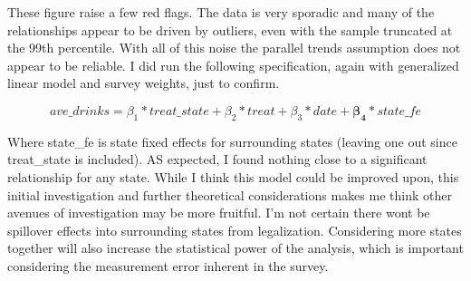 \documentclass[11pt]{article}
\begin{document}
\begin{figure}
	\hspace{0mm}

\end{figure}

These figure raise a few red flags. The data is very sporadic and many of the relationships appear to be driven by outliers, even with the sample truncated at the 99th percentile. With all of this noise the parallel trends assumption does not appear to be reliable. I did run the following specification, again with  generalized linear model and survey weights, just to confirm. 

$$
ave\_drinks =  \beta_1 * treat\_state + \beta_2*treat + \beta_3*date + \bm{\beta_4}*state\_fe
$$

Where state\_fe is state fixed effects for surrounding states (leaving one out since treat\_state is included). AS expected, I found nothing close to a significant relationship for any state. While I think this model could be improved upon, this initial investigation and further theoretical considerations makes me think other avenues of investigation may be more fruitful. I'm not certain there wont be spillover effects into surrounding states from legalization. Considering  more states together will also increase the statistical power of the analysis, which is important considering the measurement error inherent in the survey.   
\end{document}

